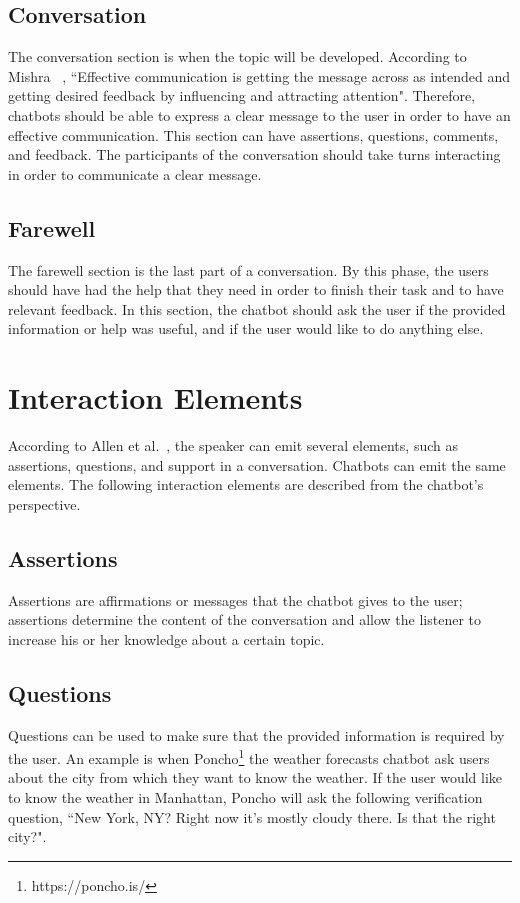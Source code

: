 \documentclass[a4paper,10pt]{article}
\begin{document}
\subsection{Conversation}
The conversation section is when the topic will be developed. According to Mishra ~\cite{effectivCommunication}, ``Effective communication is getting the message across as intended and getting desired feedback by influencing and attracting attention". Therefore, chatbots should be able to express a clear message to the user in order to have an effective communication. This section can have assertions, questions, comments, and feedback. The participants of the conversation should take turns interacting in order to communicate a clear message.

\subsection{Farewell}
The farewell section is the last part of a conversation. By this phase, the users should have had the help that they need in order to finish their task and to have relevant feedback. In this section, the chatbot should ask the user if the provided information or help was useful, and if the user would like to do anything else. 

\section{Interaction Elements}
According to Allen et al.~\cite{allen1978conversation}, the speaker can emit several elements, such as assertions, questions, and support in a conversation. Chatbots can emit the same elements. The following interaction elements are described from the chatbot's perspective. 

\subsection{Assertions}
Assertions are affirmations or messages that the chatbot gives to the user; assertions determine the content of the conversation and allow the listener to increase his or her knowledge about a certain topic. 

\subsection{Questions}
Questions can be used to make sure that the provided information is required by the user. An example is when Poncho\footnote{https://poncho.is/} the weather forecasts chatbot ask users about the city from which they want to know the weather. If the user would like to know the weather in Manhattan, Poncho will ask the following verification question, ``New York, NY? Right now it's mostly cloudy there. Is that the right city?".
\end{document}
